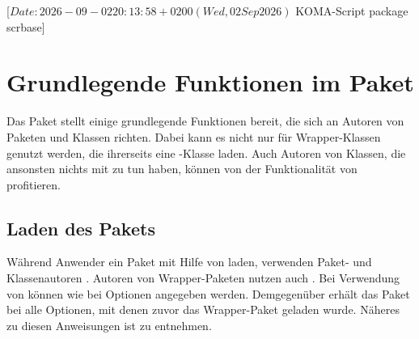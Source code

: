 %
%
%
%
%
%
%

                 [$Date: 2026-09-02 20:13:58 +0200 (Wed, 02 Sep 2026) $
                  KOMA-Script package scrbase]

\chapter{Grundlegende Funktionen im Paket }
\BeginIndexGroup
{}%

Das Paket  stellt einige grundlegende Funktionen bereit, die
sich an Autoren von Paketen und Klassen richten. Dabei kann es nicht nur für
Wrapper-Klassen genutzt werden, die ihrerseits eine \KOMAScript-Klasse
laden. Auch Autoren von Klassen, die ansonsten nichts mit \KOMAScript{} zu tun
haben, können von der Funktionalität von  profitieren.

\section{Laden des Pakets}

Während Anwender ein Paket mit Hilfe von  laden, verwenden
Paket- und Klassenautoren
. Autoren von Wrapper-Paketen
nutzen auch
. Bei
Verwendung von  können wie bei
 Optionen angegeben
werden. Demgegenüber erhält das Paket bei 
alle Optionen, mit denen zuvor das Wrapper-Paket geladen wurde. Näheres zu
diesen Anweisungen ist \cite{latex:clsguide} zu entnehmen.

